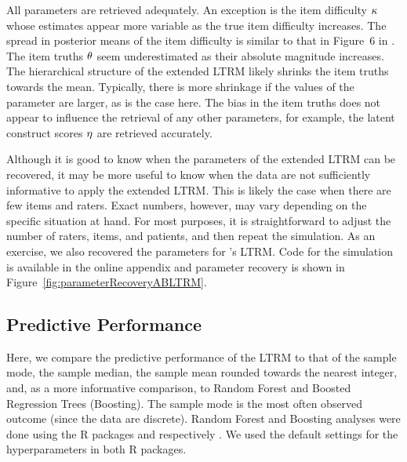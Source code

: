 \documentclass[a4paper,usenames,dvipsnames]{article}
\newenvironment{revision}{\color{teal}}{\color{black}}
\begin{document}
All parameters are retrieved adequately. An exception is the item difficulty $\kappa$ whose estimates appear more variable as the true item difficulty increases. The spread in posterior means of the item difficulty is similar to that in Figure~6 in \AB{}. The item truths $\theta$ seem underestimated as their absolute magnitude increases. The hierarchical structure of the extended LTRM likely shrinks the item truths towards the mean. Typically, there is more shrinkage if the values of the parameter are larger, as is the case here. The bias in the item truths does not appear to influence the retrieval of any other parameters, for example, the latent construct scores $\eta$ are retrieved accurately.

Although it is good to know when the parameters of the extended LTRM can be recovered, it may be more useful to know when the data are not sufficiently informative to apply the extended LTRM. This is likely the case when there are few items and raters. Exact numbers, however, may vary depending on the specific situation at hand. For most purposes, it is straightforward to adjust the number of raters, items, and patients, and then repeat the simulation. As an exercise, we also recovered the parameters for \AB{}'s LTRM. Code for the simulation is available in the online appendix and parameter recovery is shown in Figure~\ref{fig:parameterRecoveryABLTRM}.

\subsection*{Predictive Performance}
Here, we compare the predictive performance of the LTRM to that of the sample mode\begin{revision}, the sample median, the sample mean rounded towards the nearest integer, \end{revision} and, as a more informative comparison, to Random Forest and Boosted Regression Trees (Boosting).
The sample mode is the most often observed outcome (since the data are discrete).
Random Forest and Boosting analyses were done using the R packages  and  respectively \cite{ranger2017, gbmPackage}. We used the default settings for the hyperparameters in both R packages.
\end{document}
